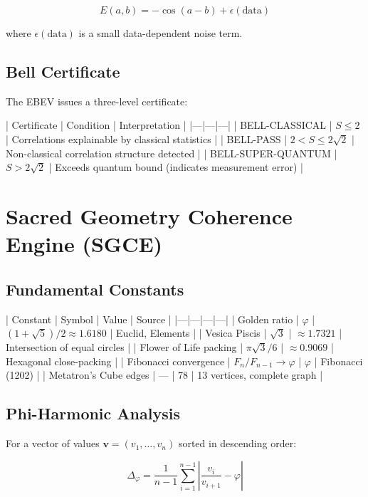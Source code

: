 \documentclass[11pt]{article}
\theoremstyle{plain}
\begin{document}
\begin{equation}
E(a, b) = -\cos(a - b) + \epsilon(\text{data})
\end{equation}

where \( \epsilon(\text{data}) \) is a small data-dependent noise term.

\subsection{Bell Certificate}

The EBEV issues a three-level certificate:

| Certificate | Condition | Interpretation |
|—|—|—|
| BELL-CLASSICAL | \( S \leq 2 \) | Correlations explainable by classical statistics |
| BELL-PASS | \( 2 < S \leq 2\sqrt{2} \) | Non-classical correlation structure detected |
| BELL-SUPER-QUANTUM | \( S > 2\sqrt{2} \) | Exceeds quantum bound (indicates measurement error) |


\section{Sacred Geometry Coherence Engine (SGCE)}

\subsection{Fundamental Constants}

| Constant | Symbol | Value | Source |
|—|—|—|—|
| Golden ratio | \( \varphi \) | \( (1+\sqrt{5})/2 \approx 1.6180 \) | Euclid, Elements |
| Vesica Piscis | \( \sqrt{3} \) | \( \approx 1.7321 \) | Intersection of equal circles |
| Flower of Life packing | \( \pi\sqrt{3}/6 \) | \( \approx 0.9069 \) | Hexagonal close-packing |
| Fibonacci convergence | \( F_n/F_{n-1} \to \varphi \) | \( \varphi \) | Fibonacci (1202) |
| Metatron's Cube edges | — | 78 | 13 vertices, complete graph |

\subsection{Phi-Harmonic Analysis}

For a vector of values \( \mathbf{v} = (v_1, \ldots, v_n) \) sorted in descending order:

\begin{equation}
\Delta_\varphi = \frac{1}{n-1} \sum_{i=1}^{n-1} \left| \frac{v_i}{v_{i+1}} - \varphi \right|
\end{equation}
\end{document}
